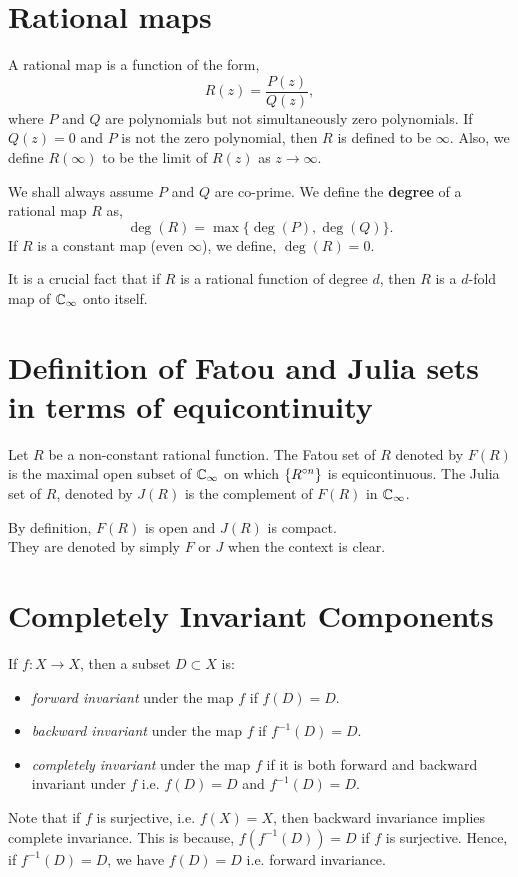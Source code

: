 \section{Rational maps}
\begin{definition}
	A rational map is a function of the form, \[
		R(z)=\frac{P(z)}{Q(z)}
	,\] where \( P \) and \( Q \) are polynomials but not simultaneously zero polynomials.
	If \( Q(z)=0 \) and \( P \) is not the zero polynomial, then \( R \) is defined to be \( \infty \).
	Also, we define \( R(\infty) \) to be the limit of \( R(z) \) as \( z\to \infty \).
\end{definition}
We shall always assume \( P \) and \( Q \) are co-prime. We define the \textbf{degree} of a rational map \( R \) as, \[
	\deg(R)=\max\{\deg(P),\deg(Q)\}
.\] If \( R \) is a constant map (even \( \infty \)), we define, \( \deg(R)=0 \).

It is a crucial fact that if \( R \) is a rational function of degree \( d \), then \( R \) is a \( d \)-fold
map of \( \mathbb{C}_\infty \) onto itself.


\section{Definition of Fatou and Julia sets in terms of equicontinuity}
\begin{definition}
	Let \( R \) be a non-constant rational function. The Fatou set of \( R \) denoted by \( F(R) \) is 
	the maximal open subset of \( \mathbb{C}_\infty \) on which \( \{\ror[n]\}\) is equicontinuous. The Julia set of \( R \),
	denoted by \( J(R) \) is the complement of \( F(R) \) in \( \mathbb{C}_\infty \).
\end{definition}
By definition, \( F(R) \) is open and \( J(R) \) is compact.\\
They are denoted by simply \( F \) or \( J \) when the context is clear.

\section{Completely Invariant Components}
If \( f:X\to X \), then a subset \( D\subset X \) is:
\begin{itemize}
	\item \emph{forward invariant} under the map \( f \) if \( f(D)=D \).
	\item \emph{backward invariant} under the map \( f \) if \( f^{-1}(D)=D \).
	\item \emph{completely invariant} under the map \( f \) if it is both forward
		and backward invariant under \( f \) i.e. \( f(D)=D \) and \( f^{-1}(D)=D \).
\end{itemize}
Note that if \( f \) is surjective, i.e. \( f(X)=X \), then backward invariance implies complete invariance.
This is because, \( f(f^{-1}(D))=D \) if \( f \) is surjective. Hence, if \(f^{-1}(D)=D  \), we have \( f(D)=D \) i.e.
forward invariance.

